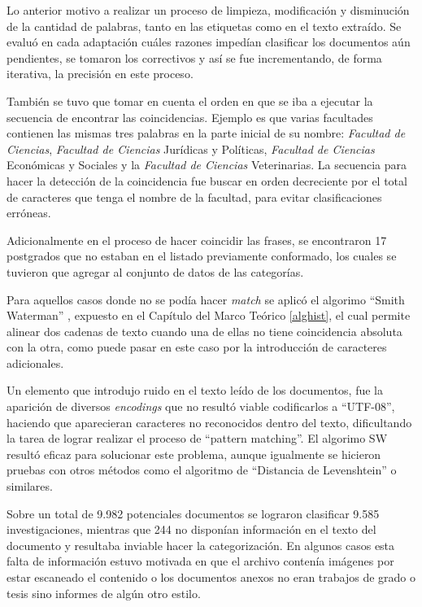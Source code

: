 \documentclass[
  12pt,
  openany]{book}
\begin{document}
Lo anterior motivo a realizar un proceso de limpieza, modificación y disminución de la cantidad de palabras, tanto en las etiquetas como en el texto extraído. Se evaluó en cada adaptación cuáles razones impedían clasificar los documentos aún pendientes, se tomaron los correctivos y así se fue incrementando, de forma iterativa, la precisión en este proceso.

También se tuvo que tomar en cuenta el orden en que se iba a ejecutar la secuencia de encontrar las coincidencias. Ejemplo es que varias facultades contienen las mismas tres palabras en la parte inicial de su nombre: \emph{Facultad de Ciencias}, \emph{Facultad de Ciencias} Jurídicas y Políticas, \emph{Facultad de Ciencias} Económicas y Sociales y la \emph{Facultad de Ciencias} Veterinarias. La secuencia para hacer la detección de la coincidencia fue buscar en orden decreciente por el total de caracteres que tenga el nombre de la facultad, para evitar clasificaciones erróneas.

Adicionalmente en el proceso de hacer coincidir las frases, se encontraron 17 postgrados que no estaban en el listado previamente conformado, los cuales se tuvieron que agregar al conjunto de datos de las categorías.

Para aquellos casos donde no se podía hacer \emph{match} se aplicó el algorimo ``Smith Waterman'' \citep{smith1981}, expuesto en el Capítulo del Marco Teórico \ref{alghist}, el cual permite alinear dos cadenas de texto cuando una de ellas no tiene coincidencia absoluta con la otra, como puede pasar en este caso por la introducción de caracteres adicionales.

Un elemento que introdujo ruido en el texto leído de los documentos, fue la aparición de diversos \emph{encodings} que no resultó viable codificarlos a ``UTF-08'', haciendo que aparecieran caracteres no reconocidos dentro del texto, dificultando la tarea de lograr realizar el proceso de ``pattern matching''. El algorimo SW resultó eficaz para solucionar este problema, aunque igualmente se hicieron pruebas con otros métodos como el algoritmo de ``Distancia de Levenshtein'' o similares.

Sobre un total de 9.982 potenciales documentos se lograron clasificar 9.585 investigaciones, mientras que 244 no disponían información en el texto del documento y resultaba inviable hacer la categorización. En algunos casos esta falta de información estuvo motivada en que el archivo contenía imágenes por estar escaneado el contenido o los documentos anexos no eran trabajos de grado o tesis sino informes de algún otro estilo.
\end{document}
